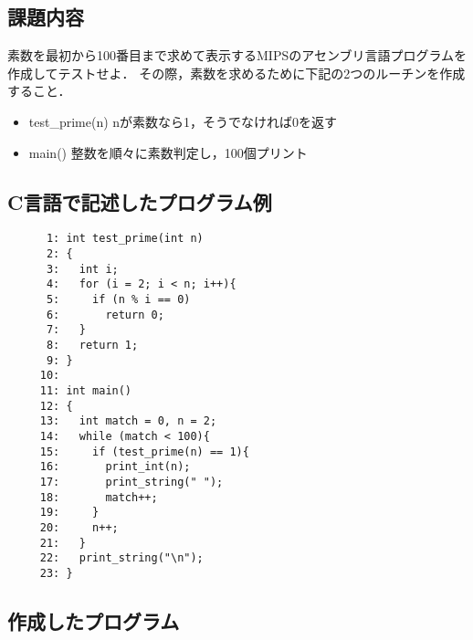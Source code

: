 \documentclass[a4j,11pt]{jarticle}
\begin{document}
\subsection{課題内容}
素数を最初から100番目まで求めて表示するMIPSのアセンブリ言語プログラムを作成してテストせよ． 
その際，素数を求めるために下記の2つのルーチンを作成すること．

\begin{itemize}
      \item test\_prime(n)    nが素数なら1，そうでなければ0を返す
      \item main()       整数を順々に素数判定し，100個プリント
\end{itemize}

\subsection{C言語で記述したプログラム例}

\begin{verbatim}
      1: int test_prime(int n)
      2: {
      3:   int i;
      4:   for (i = 2; i < n; i++){
      5:     if (n % i == 0)
      6:       return 0;
      7:   }
      8:   return 1;
      9: }
     10: 
     11: int main()
     12: {
     13:   int match = 0, n = 2;
     14:   while (match < 100){
     15:     if (test_prime(n) == 1){
     16:       print_int(n);
     17:       print_string(" ");
     18:       match++;
     19:     }
     20:     n++;
     21:   }
     22:   print_string("\n");
     23: }
\end{verbatim}

\subsection{作成したプログラム}
\end{document}
